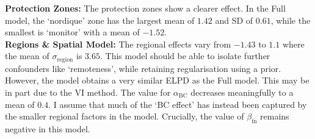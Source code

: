 \textbf{Protection Zones:} The protection zones show a clearer effect. In the Full model, the `nordique' zone has the largest mean of $1.42$ and SD of $0.61$, while the smallest is `monitor' with a mean of $-1.52$.\\
\textbf{Regions \& Spatial Model:} The regional effects vary from $-1.43$ to $1.1$ where the mean of $\sigma_{\text{region}}$ is $3.65$. This model should be able to isolate further confounders like `remoteness', while retaining regularisation using a prior. However, the model obtains a very similar ELPD as the Full model. This may be in part due to the VI method. The value for $\alpha_{\text{BC}}$ decreases meaningfully to a mean of $0.4$. I assume that much of the `BC effect' has instead been captured by the smaller regional factors in the model. Crucially, the value of $\beta_{\text{fn}}$ remains negative in this model.

